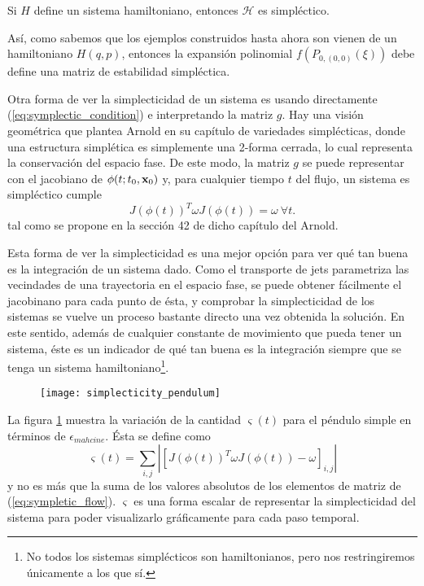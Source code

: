 \begin{corolario}
Si $H$ define un sistema hamiltoniano, entonces $\mathcal{H}$ es simpléctico. 
\end{corolario}

Así, como sabemos que los ejemplos construidos hasta ahora son vienen de un hamiltoniano $H(q,p)$, entonces la expansión polinomial $f(P_{0,(0,0)}(\xi))$ debe define una matriz de estabilidad simpléctica. 

Otra forma de ver la simplecticidad de un sistema es usando directamente (\ref{eq:symplectic_condition}) e interpretando la matriz $g$. Hay una visión geométrica que plantea Arnold \cite{Arnold1989} en su capítulo de variedades simplécticas, donde una estructura simplética es simplemente una 2-forma cerrada, lo cual representa la conservación del espacio fase. De este modo, la matriz $g$ se puede representar con el jacobiano de $\phi(t;t_0,\mathbf{x}_0)$ y, para cualquier tiempo $t$ del flujo, un sistema es simpléctico cumple
\begin{equation}
 J(\phi(t))^T \omega J(\phi(t)) = \omega \ \forall t.
 \label{eq:sympletic_flow}
\end{equation} 
tal como se propone en la sección 42 de dicho capítulo del Arnold.

Esta forma de ver la simplecticidad es una mejor opción para ver qué tan buena es la integración de un sistema dado. Como el transporte de jets parametriza las vecindades de una trayectoria en el espacio fase, se puede obtener fácilmente el jacobinano para cada punto de ésta, y comprobar la simplecticidad de los sistemas se vuelve un proceso bastante directo una vez obtenida la solución. En este sentido, además de cualquier constante de movimiento que pueda tener un sistema, éste es un indicador de qué tan buena es la integración siempre que se tenga un sistema hamiltoniano\footnote{No todos los sistemas simplécticos son hamiltonianos, pero nos restringiremos únicamente a los que sí.}.

\begin{figure}[h!]
 \centering
 \texttt{[image: simplecticity\_pendulum]}
 \caption{}
 \label{fig:simplecticity_pendulum}
\end{figure}

La figura \ref{fig:simplecticity_pendulum} muestra la variación de la cantidad $\varsigma(t)$ para el péndulo simple en términos de $\epsilon_{mahcine}$. Ésta se define como
\begin{equation}
 \varsigma(t) = \sum_{i,j} |\left[ J(\phi(t))^T \omega J(\phi(t)) - \omega \right]_{i,j}|
 \label{eq:scalar_symplecticity}
\end{equation}
y no es más que la suma de los valores absolutos de los elementos de matriz de (\ref{eq:sympletic_flow}). $\varsigma$ es una forma escalar de representar la simplecticidad del sistema para poder visualizarlo gráficamente para cada paso temporal.
  
